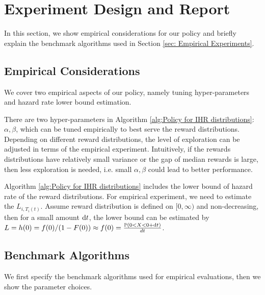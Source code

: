 \section{Experiment Design and Report}
\label{app-sec: Experiment Design and Report} 

In this section, we show empirical considerations for our policy and briefly explain the benchmark algorithms used in Section \ref{sec: Empirical Experiments}. 

\subsection{Empirical Considerations}
\label{app-sec: Empirical Considerations}

We cover two empirical aspects of our policy, namely tuning hyper-parameters and hazard rate lower bound estimation.

There are two hyper-parameters in Algorithm \ref{alg:Policy for IHR distributions}: $\alpha, \beta$, which can be tuned empirically to best serve the reward distributions. Depending on different reward distributions, the level of exploration can be adjusted in terms of the empirical experiment. Intuitively, if the rewards distributions have relatively small variance or the gap of median rewards is large, then less exploration is needed, i.e. small $\alpha, \beta$ could lead to better performance.

Algorithm \ref{alg:Policy for IHR distributions} includes the lower bound of hazard rate of the reward distributions. For empirical experiment, we need to estimate the $L_{i,T_i(t)}$.
Assume reward distribution is defined on $[0, \infty)$ and non-decreasing, then for a small amount $\mathrm{d} t$, the lower bound can be estimated by $L = h(0) = f(0)/ (1- F(0)) \approx f(0)  = \frac{\mathbb{P}\left(0 < X < 0 + \mathrm{d} t\right)}{dt}$.


\subsection{Benchmark Algorithms}
\label{app-subsec: Benchmark Algorithms}


 We first specify the benchmark algorithms used for empirical evaluations, then we show the parameter choices.  

